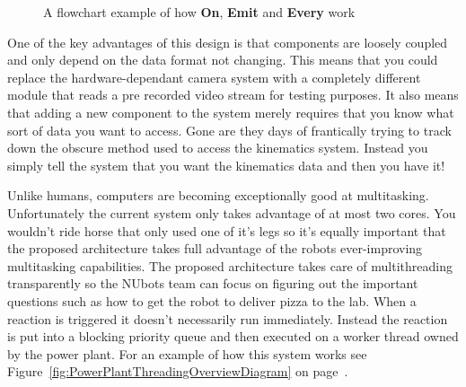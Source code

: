 \documentclass[english,12pt]{scrartcl}
\begin{document}
\begin{figure}[b]
                \caption {A flowchart example of how \textbf{On}, \textbf{Emit} and \textbf{Every}
                    work}
                \label{fig:OnAndEmitExample}
            \end{figure}
            
            One of the key advantages of this design is that components are loosely coupled and only
            depend on the data format not changing. This means that you could replace the
            hardware-dependant camera system with a completely different module that reads a pre
            recorded video stream for testing purposes. It also means that adding a new component to
            the system merely requires that you know what sort of data you want to access. Gone are
            they days of frantically trying to track down the obscure method used to access the
            kinematics system. Instead you simply tell the system that you want the kinematics data
            and then you have it!
            
            Unlike humans, computers are becoming exceptionally good at multitasking. Unfortunately
            the current system only takes advantage of at most two cores. You wouldn't ride horse
            that only used one of it's legs so it's equally important that the proposed architecture
            takes full advantage of the robots ever-improving multitasking capabilities. The
            proposed architecture takes care of multithreading transparently so the NUbots team can
            focus on figuring out the important questions such as how to get the robot to deliver
            pizza to the lab. When a reaction is triggered it doesn't necessarily run immediately.
            Instead the reaction is put into a blocking priority queue and then executed on a worker
            thread owned by the power plant. For an example of how this system works see
            Figure~\ref{fig:PowerPlantThreadingOverviewDiagram} on
            page~\pageref{fig:PowerPlantThreadingOverviewDiagram}.
            
\end{document}
